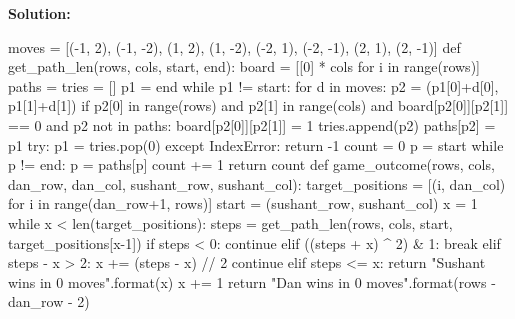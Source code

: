\documentclass{assignment-263}
\begin{document}
{\bf Solution:}
\begin{python}
moves = [(-1, 2), (-1, -2), (1, 2), (1, -2), (-2, 1), (-2, -1), (2, 1), (2, -1)]
def get_path_len(rows, cols, start, end):
	board = [[0] * cols for i in range(rows)]
	paths = {}
	tries = []
	p1 = end
	while p1 != start:
		for d in moves:
			p2 = (p1[0]+d[0], p1[1]+d[1])
			if p2[0] in range(rows) and p2[1] in range(cols) and  
			board[p2[0]][p2[1]] == 0 and p2 not in paths:
				board[p2[0]][p2[1]] = 1
				tries.append(p2)
				paths[p2] = p1
		try:
			p1 = tries.pop(0)
		except IndexError:
			return -1
	count = 0
	p = start
	while p != end:
		p = paths[p]
		count += 1
	return count
def game_outcome(rows, cols, dan_row, dan_col, sushant_row, sushant_col):
	target_positions = [(i, dan_col) for i in range(dan_row+1, rows)]
	start = (sushant_row, sushant_col)
	x = 1
	while x < len(target_positions):
		steps = get_path_len(rows, cols, start, target_positions[x-1])
		if steps < 0:
			continue
		elif ((steps + x) ^ 2) & 1:
			break
		elif steps - x > 2:
			x += (steps - x) // 2
			continue
		elif steps <= x:
			return "Sushant wins in {0} moves".format(x)
		x += 1
	return "Dan wins in {0} moves".format(rows - dan_row - 2)
\end{python}
\end{document}
